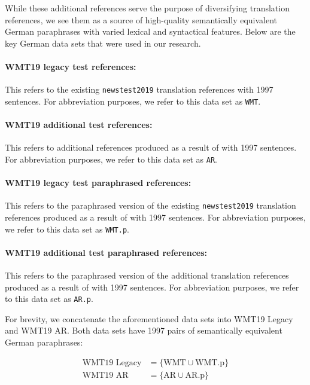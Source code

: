 \documentclass[11pt,a4paper]{article}
\begin{document}
While these additional references serve the purpose of diversifying translation references, we see them as a source of high-quality semantically equivalent German paraphrases with varied lexical and syntactical features. Below are the key German data sets that were used in our research.

\paragraph{WMT19 legacy test references:} This refers to the existing \texttt{newstest2019} translation references with 1997 sentences. For abbreviation purposes, we refer to this data set as \texttt{WMT}. 

\paragraph{WMT19 additional test references:} This refers to additional references produced as a result of \citet{freitag-bleu-paraphrase-references-2020} with 1997 sentences. For abbreviation purposes, we refer to this data set as \texttt{AR}. 

\paragraph{WMT19 legacy test paraphrased references:} This refers to the paraphrased version of the existing \texttt{newstest2019} translation references produced as a result of \citet{freitag-bleu-paraphrase-references-2020} with 1997 sentences. For abbreviation purposes, we refer to this data set as \texttt{WMT.p}. 

\paragraph{WMT19 additional test paraphrased references:}This refers to the paraphrased version of the additional translation references produced as a result of \citet{freitag-bleu-paraphrase-references-2020} with 1997 sentences. For abbreviation purposes, we refer to this data set as \texttt{AR.p}.

For brevity, we concatenate the aforementioned data sets into WMT19 Legacy and WMT19 AR. Both data sets have 1997 pairs of semantically equivalent German paraphrases:

\vspace{-10pt}
\begin{align}
  \text{WMT19 Legacy} &= \{\text{WMT} \cup \text{WMT.p} \} \label{wmt19legacy} \\
  \text{WMT19 AR} &= \{\text{AR} \cup \text{AR.p} \} \label{wmt19ar}
\end{align}
\end{document}
